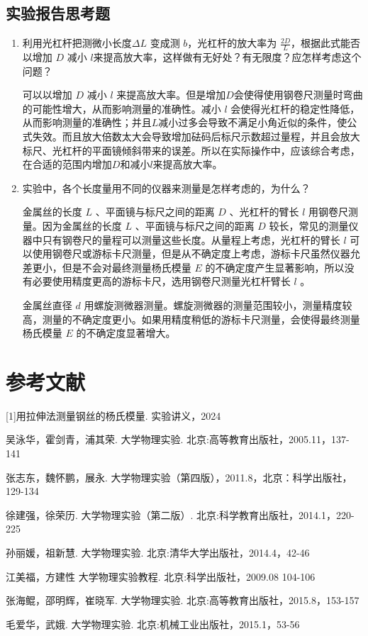 \documentclass[a4paper]{extarticle}
\begin{document}
    \subsection{实验报告思考题}
    \begin{enumerate}
        \item 利用光杠杆把测微小长度$\Delta L$ 变成测 $b$，光杠杆的放大率为 $\frac{2D}{L}$，根据此式能否以增加 $D$ 减小 $l$来提高放大率，这样做有无好处？有无限度？应怎样考虑这个问题？
        \par
        可以以增加 $D$ 减小 $l$ 来提高放大率。但是增加$D$会使得使用钢卷尺测量时弯曲的可能性增大，从而影响测量的准确性。减小 $l$ 会使得光杠杆的稳定性降低，从而影响测量的准确性；并且$L$减小过多会导致不满足小角近似的条件，使公式失效。而且放大倍数太大会导致增加砝码后标尺示数超过量程，并且会放大标尺、光杠杆的平面镜倾斜带来的误差。所以在实际操作中，应该综合考虑，在合适的范围内增加$D$和减小$l$来提高放大率。
        \item 实验中，各个长度量用不同的仪器来测量是怎样考虑的，为什么？
        \par
        金属丝的长度 $L$ 、平面镜与标尺之间的距离 $D$ 、光杠杆的臂长 $l$ 用钢卷尺测量。因为金属丝的长度 $L$ 、平面镜与标尺之间的距离 $D$ 较长，常见的测量仪器中只有钢卷尺的量程可以测量这些长度。从量程上考虑，光杠杆的臂长 $l$ 可以使用钢卷尺或游标卡尺测量，但是从不确定度上考虑，游标卡尺虽然仪器允差更小，但是不会对最终测量杨氏模量 $E$ 的不确定度产生显著影响，所以没有必要使用精度更高的游标卡尺，选用钢卷尺测量光杠杆臂长 $l$ 。
        \par
        金属丝直径 $d$ 用螺旋测微器测量。螺旋测微器的测量范围较小，测量精度较高，测量的不确定度更小。如果用精度稍低的游标卡尺测量，会使得最终测量杨氏模量 $E$ 的不确定度显著增大。
    \end{enumerate}
    \section*{参考文献}
    [1]用拉伸法测量钢丝的杨氏模量. 实验讲义，2024\par
    [2]吴泳华，霍剑青，浦其荣. 大学物理实验. 北京:高等教育出版社，2005.11，137-141\par
    [3]张志东，魏怀鹏，展永. 大学物理实验（第四版），2011.8，北京：科学出版社，129-134\par
    [4]徐建强，徐荣历. 大学物理实验（第二版）. 北京:科学教育出版社，2014.1，220-225\par
    [5]孙丽媛，祖新慧. 大学物理实验. 北京:清华大学出版社，2014.4，42-46\par
    [6]江美福，方建性 大学物理实验教程. 北京:科学出版社，2009.08 104-106\par
    [7]张海鲲，邵明辉，崔晓军. 大学物理实验. 北京:高等教育出版社，2015.8，153-157\par
    [8]毛爱华，武娥. 大学物理实验. 北京:机械工业出版社，2015.1，53-56
    \newpage
\end{document}
